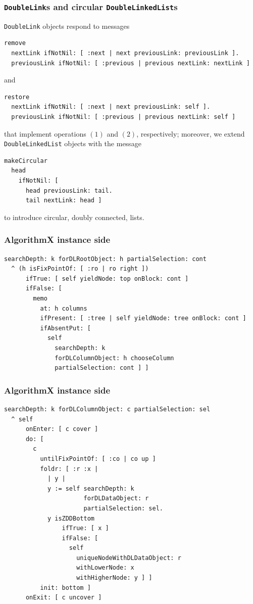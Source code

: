 \documentclass[10pt]{beamer}
\begin{document}
\begin{frame}[fragile]
\frametitle{\texttt{DoubleLink}s and circular \texttt{DoubleLinkedList}s}
\texttt{DoubleLink} objects respond to messages
\begin{verbatim}
remove
  nextLink ifNotNil: [ :next | next previousLink: previousLink ].
  previousLink ifNotNil: [ :previous | previous nextLink: nextLink ]
\end{verbatim}
and
\begin{verbatim}
restore
  nextLink ifNotNil: [ :next | next previousLink: self ].
  previousLink ifNotNil: [ :previous | previous nextLink: self ]
\end{verbatim}
that implement operations $(1)$ and $(2)$, respectively;
moreover, we extend \texttt{DoubleLinkedList} objects with the message
\begin{verbatim}
makeCircular
  head
    ifNotNil: [ 
      head previousLink: tail.
      tail nextLink: head ]
\end{verbatim}
to introduce circular, doubly connected, lists.
\end{frame}

\begin{frame}[fragile]
\frametitle{AlgorithmX instance side}
\begin{verbatim}
searchDepth: k forDLRootObject: h partialSelection: cont
  ^ (h isFixPointOf: [ :ro | ro right ])
      ifTrue: [ self yieldNode: top onBlock: cont ]
      ifFalse: [ 
        memo
          at: h columns
          ifPresent: [ :tree | self yieldNode: tree onBlock: cont ]
          ifAbsentPut: [ 
            self
              searchDepth: k
              forDLColumnObject: h chooseColumn
              partialSelection: cont ] ]
\end{verbatim}
\end{frame}

\begin{frame}[fragile]
\frametitle{AlgorithmX instance side}
\begin{verbatim}
searchDepth: k forDLColumnObject: c partialSelection: sel
  ^ self
      onEnter: [ c cover ]
      do: [ 
        c
          untilFixPointOf: [ :co | co up ]
          foldr: [ :r :x | 
            | y |
            y := self searchDepth: k 
                      forDLDataObject: r 
                      partialSelection: sel.
            y isZDDBottom
                ifTrue: [ x ]
                ifFalse: [ 
                  self
                    uniqueNodeWithDLDataObject: r
                    withLowerNode: x
                    withHigherNode: y ] ]
          init: bottom ]
      onExit: [ c uncover ]
\end{verbatim}
\end{frame}
\end{document}
